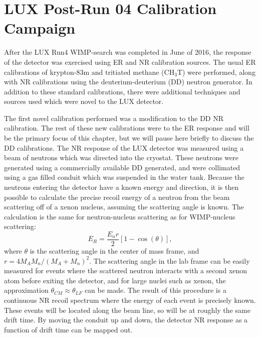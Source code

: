 \chapter{LUX Post-Run 04 Calibration Campaign}
After the LUX Run4 WIMP-search was completed in June of 2016, the response of the detector was exercised using ER and NR calibration sources. The usual ER calibrations of krypton-83m\cite{lux_kr1,lux_kr2} and tritiated methane (CH$_3$T)\cite{lux_tritium} were performed, along with NR calibrations using the deuterium-deuterium (DD) neutron generator\cite{lux_dd1,lux_dd2}. In addition to these standard calibrations, there were additional techniques and sources used which were novel to the LUX detector. 

The first novel calibration performed was a modification to the DD NR calibration. The rest of these new calibrations were to the ER response and will be the primary focus of this chapter, but we will pause here briefly to discuss the DD calibrations. The NR response of the LUX detector was measured using a beam of neutrons which was directed into the cryostat. These neutrons were generated using a commercially available DD generated, and were collimated using a gas filled conduit which was suspended in the water tank. Because the neutrons entering the detector have a known energy and direction, it is then possible to calculate the precise recoil energy of a neutron from the beam scattering off of a xenon nucleus, assuming the scattering angle is known. The calculation is the same for neutron-nucleus scattering as for WIMP-nucleus scattering:
\begin{equation}
E_R=\frac{E_nr}{2}[1-\cos(\theta)],
\end{equation}
where $\theta$ is the scattering angle in the center of mass frame, and $r=4M_AM_n/(M_A+M_n)^2$. The scattering angle in the lab frame can be easily measured for events where the scattered neutron interacts with a second xenon atom before exiting the detector, and for large nuclei such as xenon, the approximation $\theta_{CM}\approx \theta_{LF}$ can be made. The result of this procedure is a continuous NR recoil spectrum where the energy of each event is precisely known. These events will be located along the beam line, so will be at roughly the same drift time. By moving the conduit up and down, the detector NR response as a function of drift time can be mapped out.\cite{lux_dd1,lux_dd2}
